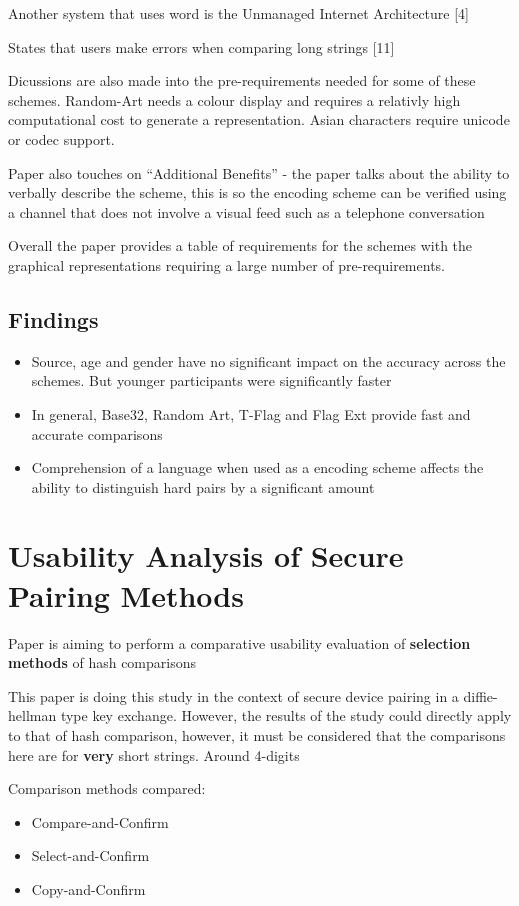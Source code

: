 Another system that uses word is the Unmanaged Internet Architecture [4]

States that users make errors when comparing long strings [11]

Dicussions are also made into the pre-requirements needed for some of these schemes. Random-Art needs a colour display and requires a relativly high computational cost to generate a representation. Asian characters require unicode or codec support.

Paper also touches on ``Additional Benefits'' - the paper talks about the ability to verbally describe the scheme, this is so the encoding scheme can be verified using a channel that does not involve a visual feed such as a telephone conversation

Overall the paper provides a table of requirements for the schemes with the graphical representations requiring a large number of pre-requirements.

\subsection{Findings}
\begin{itemize}
    \item Source, age and gender have no significant impact on the accuracy across the schemes. But younger participants were significantly faster
    \item In general, Base32, Random Art, T-Flag and Flag Ext provide fast and accurate comparisons
    \item Comprehension of a language when used as a encoding scheme affects the ability to distinguish hard pairs by a significant amount
\end{itemize}

\newpage
\section{Usability Analysis of Secure Pairing Methods}

Paper is aiming to perform a comparative usability evaluation of \textbf{selection methods} of hash comparisons

This paper is doing this study in the context of secure device pairing in a diffie-hellman type key exchange. However, the results of the study could directly apply to that of hash comparison, however, it must be considered that the comparisons here are for \textbf{very} short strings. Around 4-digits 

Comparison methods compared:
\begin{itemize}
    \item Compare-and-Confirm
    \item Select-and-Confirm
    \item Copy-and-Confirm
\end{itemize}

